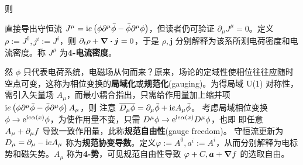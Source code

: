 
则

直接导出守恒流
$J^\mu=\mathrm{i} e\left(\phi\partial^\mu \bar{\phi}-\bar{\phi} \partial^\mu \phi \right)$，但读者仍可验证 $\partial_\mu J^\mu=0$。定义 $\rho:=J^0,j^i:=J^i$，则 $\partial_t\rho+\div\vb* j=0$，于是 $\rho,\bm j$ 分别解释为该系所测电荷密度和电流密度。称 $J^\mu$ 为\textbf{4-电流密度}。

然 $\phi$ 只代表电荷系统，电磁场从何而来？原来，场论的定域性使相位往往应随时空点可变，这称为相位变换的\textbf{局域化}或\textbf{规范化}(gauging)。为得局域 U(1) 对称性，需引入矢量场 $A_\mu$，而最小耦合指出，只需给作用量加上缩并项 $\mathrm{i} e\left(\phi\partial^\mu \bar{\phi}-\bar{\phi} \partial^\mu \phi \right) A_\mu$，则
注意 $\overline{D_\mu \phi}=\partial_\mu \bar\phi+\mathrm{i} e A_\mu \bar\phi$。
考虑局域相位变换 $\phi\to\mathrm{e}^{\mathrm{i} e\alpha(x)} \phi$，为使作用量不变，只需 $D^\mu\phi\to\mathrm{e}^{\mathrm{i} e\alpha(x)}D^\mu\phi$，也即
即任意 $A_\mu+\partial_\mu f$ 导致一致作用量，此称\textbf{规范自由性}(gauge freedom)。
守恒流更新为
$D_\mu=\partial_\mu -\mathrm{i} e A_\mu$ 称为\textbf{规范协变导数}。定义$\varphi:=A^0,a^i:=A^i$，从而分别解释为电标势和磁矢势。$A_\mu$ 称为\textbf{4-势}，可见规范自由性导致 $\varphi+C,\vb* a+\grad f$ 的选取自由。

